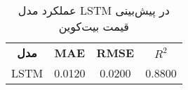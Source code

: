 
        \begin{table}[h]
            \centering
            \begin{tabular}{cccc}

                \textbf{مدل} & \textbf{MAE} & \textbf{RMSE} & \textbf{ \(R^2\) } \\

                LSTM & 0.0120 & 0.0200 & 0.8800 \\

            \end{tabular}
            \caption{عملکرد مدل LSTM در پیش‌بینی قیمت بیت‌کوین}
            \label{tab:lstm9_performance}
        \end{table}
        